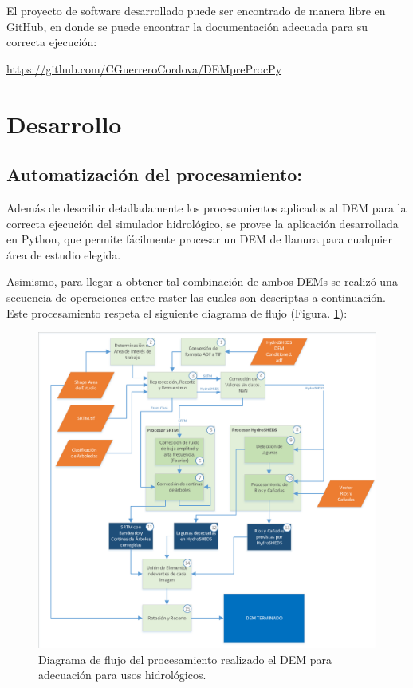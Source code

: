 \documentclass[10pt,a4paper, twoside]{report}
\begin{document}
El proyecto de software desarrollado puede ser encontrado de manera libre en GitHub, en donde se puede encontrar la documentación adecuada para su correcta ejecución: 

\hyperref[https://github.com/CGuerreroCordova/DEMpreProcPy]{https://github.com/CGuerreroCordova/DEMpreProcPy}

\section{Desarrollo}

\subsection{Automatización del procesamiento:} Además de describir detalladamente los procesamientos aplicados al DEM para la correcta ejecución del simulador hidrológico, se provee la aplicación desarrollada en Python, que permite fácilmente procesar un DEM de llanura para cualquier área de estudio elegida.

Asimismo, para llegar a obtener tal combinación de ambos DEMs se realizó una secuencia de operaciones entre raster las cuales son descriptas a continuación. Este procesamiento respeta el siguiente diagrama de flujo (Figura. \ref{FlowCompleto}):

\begin{figure}[!htb]
   \centering      
   \includegraphics[width=1.0\textwidth]{imagenes/FlowChartsCompleto.pdf}
 \caption{Diagrama de flujo del procesamiento realizado el DEM para adecuación para usos hidrológicos.}
 \label{FlowCompleto}
\end{figure}
\end{document}
